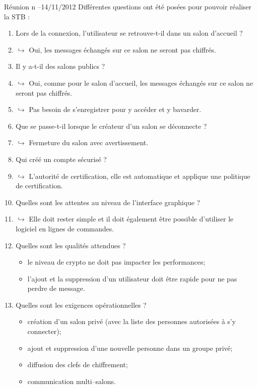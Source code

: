 \documentclass[a4paper,11pt,french]{article}
\begin{document}
\begin{paragraph}{Réunion n --14/11/2012}
Différentes questions ont été posées pour pouvoir réaliser la STB :
\begin{enumerate}
\item Lors de la connexion, l'utilisateur se retrouve-t-il dans un salon d'accueil ?
\item [] $\hookrightarrow$ Oui, les messages échangés sur ce salon ne seront pas chiffrés.

\item Il y a-t-il des salons publics ?
\item [] $\hookrightarrow$ Oui, comme pour le salon d'accueil, les messages échangés sur ce salon ne seront pas chiffrés.
\item [] $\hookrightarrow$ Pas besoin de s'enregistrer pour y accéder et y bavarder.

\item Que se passe-t-il lorsque le créateur d'un salon se déconnecte ?
\item [] $\hookrightarrow$ Fermeture du salon avec avertissement.

\item Qui créé un compte sécurisé ?
\item [] $\hookrightarrow$ L'autorité de certification, elle est automatique et applique une politique de certification.

\item Quelles sont les attentes au niveau de l'interface graphique ?
\item [] $\hookrightarrow$ Elle doit rester simple et il doit également être possible d'utiliser le logiciel en lignes de commandes.

\item  Quelles sont les qualités attendues ?
\begin{itemize}
\item le niveau de crypto ne doit pas impacter les performances;
\item l'ajout et la suppression d'un utilisateur doit être rapide pour ne pas perdre de message.
\end{itemize}

\item Quelles sont les exigences opérationnelles ?
\begin{itemize}
\item création d'un salon privé (avec la liste des personnes autorisées à s'y connecter);
\item ajout et suppression d'une nouvelle personne dans un groupe privé;
\item diffusion des clefs de chiffrement;
\item communication multi--salons.
\end{itemize}


\end{enumerate}
\end{paragraph}
\end{document}
